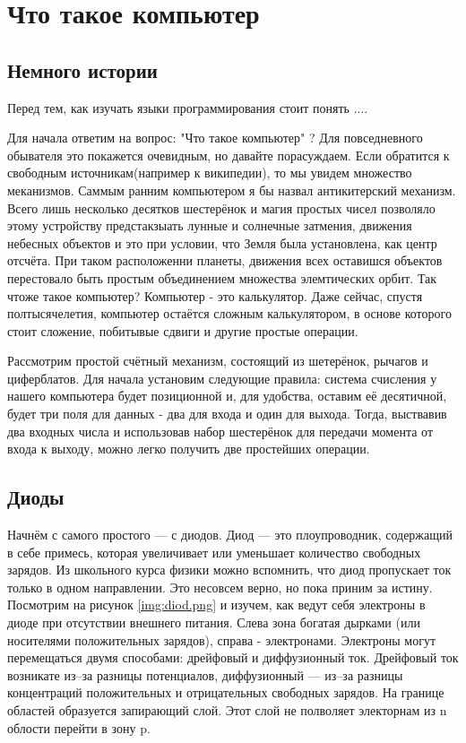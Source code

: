 \documentclass{bmstu}
\begin{document}
\tableofcontents
 



\chapter{Что такое компьютер}
\section{Немного истории}
Перед тем, как изучать языки программирования стоит понять ....

Для начала ответим на вопрос: "Что такое компьютер" ? Для повседневного обывателя это покажется очевидным, но давайте порасуждаем. 
Если обратится к свободным источникам(например к википедии), то мы увидем множество меканизмов. 
Саммым ранним компьютером я бы назвал антикитерский механизм. 
Всего лишь несколько десятков шестерёнок и магия простых чисел позволяло этому устройству предстакзыать лунные и солнечные затмения, движения небесных объектов и это при условии, что Земля была установлена, как центр отсчёта. 
При таком расположенни планеты, движения всех оставишся объектов перестовало быть простым объединением множества элемтических орбит. 
Так чтоже такое компьютер? Компьютер - это калькулятор. Даже сейчас, спустя полтысячелетия, компьютер остаётся сложным калькулятором, в основе которого стоит сложение, побитывые сдвиги и другие простые операции. 

Рассмотрим простой счётный механизм, состоящий из шетерёнок, рычагов и циферблатов. 
Для начала установим следующие правила: система счисления у нашего компьютера будет позиционной и, для удобства, оставим её десятичной, будет три поля для данных - два для входа и один для выхода. 
Тогда, выствавив два входных числа и использовав набор шестерёнок для передачи момента от входа к выходу, можно легко получить две простейших операции. 


\section{Диоды}

Начнём с самого простого --- с диодов. Диод --- это плоупроводник, содержащий в себе примесь, которая увеличивает 
или уменьшает количество свободных зарядов. 
Из школьного курса физики можно вспомнить, что диод пропускает ток только в одном направлении. 
Это несовсем верно, но пока приним за истину. 
Посмотрим на рисунок \ref{img:diod.png} и изучем, как ведут себя электроны в диоде при отсутствии внешнего питания. 
Слева зона богатая дырками (или носителями положительных зарядов), справа - электронами. 
Электроны могут перемещаться двумя способами: дрейфовый и диффузионный ток. 
Дрейфовый ток возникате из--за разницы потенциалов, диффузионный --- из--за разницы концентраций положительных и  отрицательных свободных зарядов.
На границе областей образуется запирающий слой. 
Этот слой не полволяет электорнам из n облости перейти в зону p.  
\end{document}
